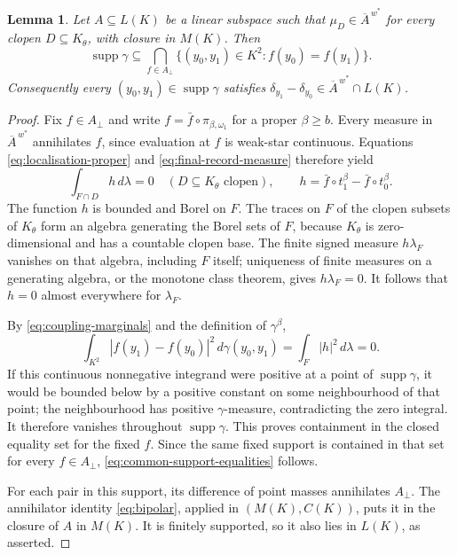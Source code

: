 \documentclass[a4paper,11pt]{amsart}
\theoremstyle{plain}
\newtheorem{lemma}[theorem]{Lemma}
\theoremstyle{definition}
\theoremstyle{remark}
\newcommand{\supp}{\operatorname{supp}}
\numberwithin{equation}{section}
\begin{document}
\begin{lemma}\label{lem:coupling}
Let $A\subseteq L(K)$ be a linear subspace such that
$\mu_D\in\overline A^{\,w^*}$ for every clopen $D\subseteq K_\theta$, with closure in $M(K)$.  Then
\begin{equation}\label{eq:common-support-equalities}
 \supp\gamma\subseteq
 \bigcap_{f\in A_\perp}
 \{(y_0,y_1)\in K^2:f(y_0)=f(y_1)\}.
\end{equation}
Consequently every $(y_0,y_1)\in\supp\gamma$ satisfies
$\delta_{y_1}-\delta_{y_0}\in\overline A^{\,w^*}\cap L(K)$.
\end{lemma}
\begin{proof}
Fix $f\in A_\perp$ and write $f=\bar f\circ\pi_{\beta,\omega_1}$ for a proper $\beta\geqslant b$.  Every measure in $\overline A^{\,w^*}$ annihilates $f$, since evaluation at $f$ is weak-star continuous.  Equations \eqref{eq:localisation-proper} and \eqref{eq:final-record-measure} therefore yield
\[
 \int_{F\cap D}h\,d\lambda=0
 \quad(D\subseteq K_\theta\text{ clopen}),
 \qquad h=\bar f\circ t_1^\beta-\bar f\circ t_0^\beta.
\]
The function $h$ is bounded and Borel on $F$.  The traces on $F$ of the clopen subsets of $K_\theta$ form an algebra generating the Borel sets of $F$, because $K_\theta$ is zero-dimensional and has a countable clopen base.  The finite signed measure $h\lambda_F$ vanishes on that algebra, including $F$ itself; uniqueness of finite measures on a generating algebra, or the monotone class theorem, gives $h\lambda_F=0$.  It follows that $h=0$ almost everywhere for $\lambda_F$.

By \eqref{eq:coupling-marginals} and the definition of $\gamma^\beta$,
\[
 \int_{K^2}|f(y_1)-f(y_0)|^2\,d\gamma(y_0,y_1)
 =\int_F|h|^2\,d\lambda=0.
\]
If this continuous nonnegative integrand were positive at a point of $\supp\gamma$, it would be bounded below by a positive constant on some neighbourhood of that point; the neighbourhood has positive $\gamma$-measure, contradicting the zero integral.  It therefore vanishes throughout $\supp\gamma$.  This proves containment in the closed equality set for the fixed $f$.  Since the same fixed support is contained in that set for every $f\in A_\perp$, \eqref{eq:common-support-equalities} follows.

For each pair in this support, its difference of point masses annihilates $A_\perp$.  The annihilator identity \eqref{eq:bipolar}, applied in $(M(K),C(K))$, puts it in the closure of $A$ in $M(K)$.  It is finitely supported, so it also lies in $L(K)$, as asserted.
\end{proof}
\end{document}
